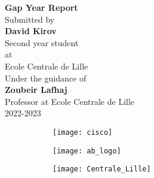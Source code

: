 \begin{titlepage}
\vspace*{\fill}

\begin{center}
\Large \textbf {Gap Year Report}\\[0.7in]       

\normalsize Submitted by \\[0.2in]
\textbf{David Kirov}\\
Second year student\\
at\\
Ecole Centrale de Lille\\

\vspace{.2in}
Under the guidance of\\[0.2in]
\textbf{Zoubeir Lafhaj}\\
Professor at Ecole Centrale de Lille\\[0.5in]
\normalsize 2022-2023\\
	\begin{figure}[b]
\centering
\begin{subfigure}{.5\textwidth}
  \centering
  \texttt{[image: cisco]}
  \label{fig:sub1}
\end{subfigure}%
\begin{subfigure}{.5\textwidth}
  \centering
  \texttt{[image: ab\_logo]}
  \label{fig:sub2}
\end{subfigure}
\begin{subfigure}{.5\textwidth}
  \centering
  \texttt{[image: Centrale\_Lille]}
  \label{fig:sub3}
\end{subfigure}
\label{fig:test}
\end{figure}

\end{center}
\vspace*{\fill}
%
\end{titlepage}

